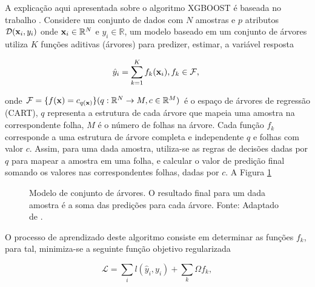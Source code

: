 A explicação aqui apresentada sobre o algoritmo XGBOOST é baseada no trabalho \cite{CHEN:2016}. Considere um conjunto de dados com $N$ amostras e $p$ atributos $\mathcal{D}({\bf x}_i, y_i)$ onde ${\bf x}_i\in\mathbb{R}^N$ e $y_i\in\mathbb{R}$, um modelo baseado em um conjunto de árvores utiliza $K$ funções aditivas (árvores) para predizer, estimar, a variável resposta

\begin{equation}\label{eq:xgboost}
\hat{y}_i=\sum_{k=1}^{K}f_{k}({\bf x}_i)\mbox{,}\,f_{k}\in\mathcal{F}\mbox{,}~
\end{equation}

onde $\mathcal{F}=\{f({\bf x})=c_{q({\bf x})}\}(q:\mathbb{R}^N\to{M},c\in\mathbb{R}^{M})$ é o espaço de árvores de regressão (CART), $q$ representa a estrutura de cada árvore que mapeia uma amostra na correspondente folha, $M$ é o número de folhas na árvore. Cada função $f_k$ corresponde a uma estrutura de árvore completa e independente $q$ e folhas com valor $c$. Assim, para uma dada amostra, utiliza-se as regras de decisões dadas por $q$ para mapear a amostra em uma folha, e calcular o valor de predição final somando os valores nas correspondentes folhas, dadas por $c$. A Figura \ref{fig:tree_model}

\begin{figure}[H]
\centering
{}
\caption{Modelo de conjunto de árvores. O resultado final para um dada amostra é a soma das predições para cada árvore. Fonte: Adaptado de \cite{CHEN:2016}.}
\label{fig:tree_model}
\end{figure}

O processo de aprendizado deste algoritmo consiste em determinar as funções $f_k$, para tal, minimiza-se a seguinte função objetivo regularizada

\begin{equation}\label{eq:xgboostmin}
\mathcal{L}=\sum_{i}l(\hat{y}_i, y_i)+\sum_{k}\Omega{f_k}\mbox{,}~
\end{equation}

